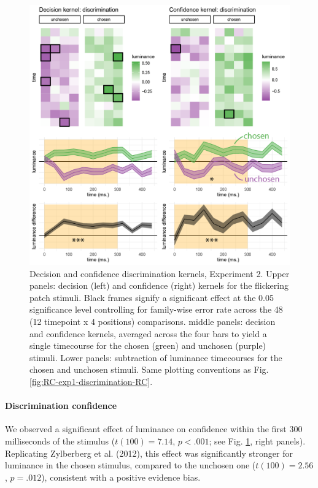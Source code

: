 \documentclass[12pt,twoside]{reedthesis}
\begin{document}
\begin{figure}
\includegraphics[width=\textwidth]{figure/RC/RC-exp2-discrimination-RC-enhanced} \caption[Discrimination decision kernels, Exp. 2]{Decision and confidence discrimination kernels, Experiment 2. Upper panels: decision (left) and confidence (right) kernels for the flickering patch stimuli. Black frames signify a significant effect at the 0.05 significance level controlling for family-wise error rate across the 48 (12 timepoint x 4 positions) comparisons. middle panels: decision and confidence kernels, averaged across the four bars to yield a single timecourse for the chosen (green) and unchosen (purple) stimuli. Lower panels: subtraction of luminance timecourses for the chosen and unchosen stimuli. Same plotting conventions as Fig. \ref{fig:RC-exp1-discrimination-RC}.}\label{fig:RC-exp2-discrimination-RC}
\end{figure}
\hypertarget{discrimination-confidence}{%
\paragraph{Discrimination confidence}\label{discrimination-confidence}}

We observed a significant effect of luminance on confidence within the first 300 milliseconds of the stimulus (\(t(100) = 7.14\), \(p < .001\); see Fig. \ref{fig:RC-exp2-discrimination-RC}, right panels). Replicating Zylberberg et al. (2012), this effect was significantly stronger for luminance in the chosen stimulus, compared to the unchosen one (\(t(100) = 2.56\), \(p = .012\)), consistent with a positive evidence bias.
\end{document}
